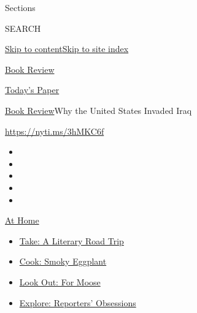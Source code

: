 Sections

SEARCH

\protect\hyperlink{site-content}{Skip to
content}\protect\hyperlink{site-index}{Skip to site index}

\href{https://www.nytimes3xbfgragh.onion/section/books/review}{Book
Review}

\href{https://myaccount.nytimes3xbfgragh.onion/auth/login?response_type=cookie\&client_id=vi}{}

\href{https://www.nytimes3xbfgragh.onion/section/todayspaper}{Today's
Paper}

\href{/section/books/review}{Book Review}\textbar{}Why the United States
Invaded Iraq

\url{https://nyti.ms/3hMKC6f}

\begin{itemize}
\item
\item
\item
\item
\item
\end{itemize}

\href{https://www.nytimes3xbfgragh.onion/spotlight/at-home?action=click\&pgtype=Article\&state=default\&region=TOP_BANNER\&context=at_home_menu}{At
Home}

\begin{itemize}
\tightlist
\item
  \href{https://www.nytimes3xbfgragh.onion/2020/07/28/books/time-for-a-literary-road-trip.html?action=click\&pgtype=Article\&state=default\&region=TOP_BANNER\&context=at_home_menu}{Take:
  A Literary Road Trip}
\item
  \href{https://www.nytimes3xbfgragh.onion/2020/07/29/magazine/bored-with-your-home-cooking-some-smoky-eggplant-will-fix-that.html?action=click\&pgtype=Article\&state=default\&region=TOP_BANNER\&context=at_home_menu}{Cook:
  Smoky Eggplant}
\item
  \href{https://www.nytimes3xbfgragh.onion/2020/07/27/travel/moose-michigan-isle-royale.html?action=click\&pgtype=Article\&state=default\&region=TOP_BANNER\&context=at_home_menu}{Look
  Out: For Moose}
\item
  \href{https://www.nytimes3xbfgragh.onion/interactive/2020/at-home/even-more-reporters-editors-diaries-lists-recommendations.html?action=click\&pgtype=Article\&state=default\&region=TOP_BANNER\&context=at_home_menu}{Explore:
  Reporters' Obsessions}
\end{itemize}

